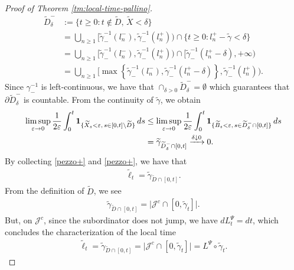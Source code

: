 \documentclass[11pt,a4paper]{article}
\theoremstyle{definition}
\theoremstyle{remark}
\begin{document}
\begin{proof}[Proof of Theorem \ref{tm:local-time-pallino}]
	\begin{align*}
		\widetilde{D}_\delta^-&:= \{t \geq 0 : t \notin \widetilde{D}, \, \widetilde{X} < \delta\}\\
		&=\bigcup_{n \geq 1} [\widetilde{\gamma}^{-1}_{-}(l_n^{-}), \widetilde{\gamma}^{-1}_{-}(l_n^{+})) \cap \{t \geq 0: l_n^+ - \widetilde{\gamma} < \delta\}\\
		&=\bigcup_{n \geq 1} [\widetilde{\gamma}^{-1}_{-}(l_n^{-}), \widetilde{\gamma}^{-1}_{-}(l_n^{+})) \cap [\widetilde{\gamma}^{-1}_{-}(l_n^+ - \delta), + \infty)\\
		&=\bigcup_{n \geq 1} [\max\left\{\widetilde{\gamma}^{-1}_{-}(l_n^-), \widetilde{\gamma}^{-1}_{-}(l_n^+ - \delta)\right\}, \widetilde{\gamma}^{-1}_{-}(l_n^+)).
	\end{align*}
	Since \(\gamma^{-1}_-\) is left-continuous, we have that \(\cap_{\delta>0} \widetilde{D}_\delta^- = \emptyset\) which guarantees that \(\partial \widetilde{D}_\delta^-\) is countable. From the continuity of \(\widetilde{\gamma}\), we obtain
	\begin{align}
		\label{pezzo-}
		\limsup_{\varepsilon \to 0} \frac{1}{2 \varepsilon} \int_0^t \mathbf{1}_{\{\widetilde{X}_s < \varepsilon, \, s \in [0,t] \setminus \widetilde{D}\}} \, ds 
		&\leq \limsup_{\varepsilon \to 0} \frac{1}{2 \varepsilon} \int_0^t \mathbf{1}_{\{\widetilde{B}_s < \varepsilon, \, s \in \widetilde{D}^-_\delta  \cap [0,t]\}} \, ds \notag \\
		&= \widetilde{\gamma}_{\widetilde{D}^-_\delta \cap [0,t]} \xrightarrow{\delta \downarrow 0} 0.
	\end{align}
	By collecting \eqref{pezzo+} and \eqref{pezzo+}, we have that
	\begin{align*}
		\widetilde{\ell}_t=\widetilde{\gamma}_{\widetilde{D} \cap [0,t]}.
	\end{align*}
	From the definition of \(\widetilde{D}\), we see
	\begin{align*}
		\widetilde{\gamma}_{\widetilde{D} \cap [0,t]}= \big\vert \mathcal{J}^c \cap [0, \widetilde{\gamma}_t] \big\vert.
	\end{align*}
	But, on \(\mathcal{J}^c\), since the subordinator does not jump, we have \(dL^\Psi_t = dt\), which concludes the characterization of the local time 
	\begin{align*}
		\widetilde{\ell}_t=\widetilde{\gamma}_{\widetilde{D} \cap [0,t]}= \big\vert \mathcal{J}^c \cap [0, \widetilde{\gamma}_t] \big\vert= L^\Psi \circ \widetilde{\gamma}_t.
	\end{align*}
\end{proof}
\end{document}
